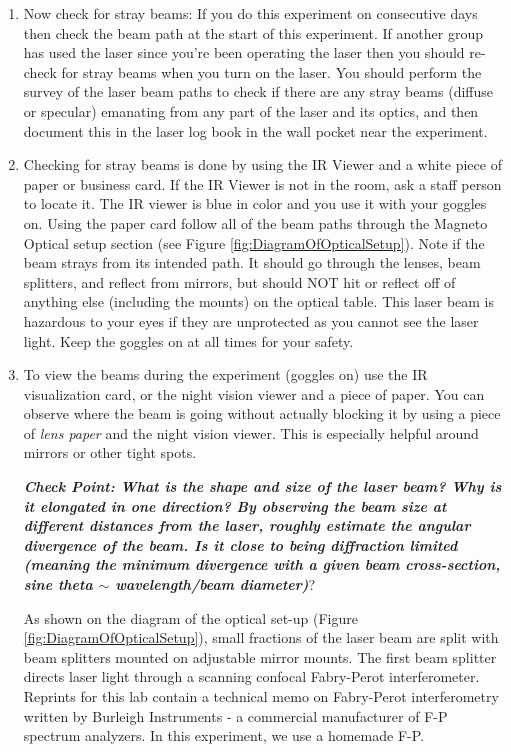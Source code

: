 \documentclass{../lab}
\begin{document}
\begin{enumerate}
    \item Now check for stray beams: If you do this experiment on consecutive days then check the beam path at the start of this experiment. If another group has used the laser since you're been operating the laser then you should re-check for stray beams when you turn on the laser. You should perform the survey of the laser beam paths to check if there are any stray beams (diffuse or specular) emanating from any part of the laser and its optics, and then document this in the laser log book in the wall pocket near the experiment.
    
    \item Checking for stray beams is done by using the IR Viewer and a white piece of paper or business card. If the IR Viewer is not in the room, ask a staff person to locate it. The IR viewer is blue in color and you use it with your goggles on. Using the paper card follow all of the beam paths through the Magneto Optical setup section (see Figure \ref{fig:DiagramOfOpticalSetup}). Note if the beam strays from its intended path. It should go through the lenses, beam splitters, and reflect from mirrors, but should NOT hit or reflect off of anything else (including the mounts) on the optical table. This laser beam is hazardous to your eyes if they are unprotected as you cannot see the laser light. Keep the goggles on at all times for your safety.
    
    \item To view the beams during the experiment (goggles on) use the IR visualization card, or the night vision viewer and a piece of paper. You can observe where the beam is going without actually blocking it by using a piece of \emph{lens paper} and the night vision viewer. This is especially helpful around mirrors or other tight spots.
    
\emph{\textbf{Check Point: What is the shape and size of the laser beam? Why is it elongated in one direction? By observing the beam size at different distances from the laser, roughly estimate the angular divergence of the beam. Is it close to being diffraction limited (meaning the minimum divergence with a given beam cross-section, sine theta $\sim$ wavelength/beam diameter)}}?

    As shown on the diagram of the optical set-up (Figure \ref{fig:DiagramOfOpticalSetup}), small fractions of the laser beam are split with beam splitters mounted on adjustable mirror mounts. The first beam splitter directs laser light through a scanning confocal Fabry-Perot interferometer. Reprints for this lab contain a technical memo on Fabry-Perot interferometry written by Burleigh Instruments - a commercial manufacturer of F-P spectrum analyzers. In this experiment, we use a homemade F-P.
    

\end{enumerate}
\end{document}
